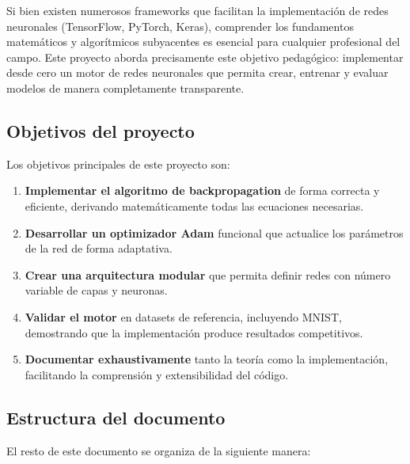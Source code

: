\documentclass[a4paper,11pt]{article}
\begin{document}
Si bien existen numerosos frameworks que facilitan la implementación de redes neuronales (TensorFlow, PyTorch, Keras), comprender los fundamentos matemáticos y algorítmicos subyacentes es esencial para cualquier profesional del campo. Este proyecto aborda precisamente este objetivo pedagógico: implementar desde cero un motor de redes neuronales que permita crear, entrenar y evaluar modelos de manera completamente transparente.

\subsection{Objetivos del proyecto}

Los objetivos principales de este proyecto son:

\begin{enumerate}
    \item \textbf{Implementar el algoritmo de backpropagation} de forma correcta y eficiente, derivando matemáticamente todas las ecuaciones necesarias.
    
    \item \textbf{Desarrollar un optimizador Adam} funcional que actualice los parámetros de la red de forma adaptativa.
    
    \item \textbf{Crear una arquitectura modular} que permita definir redes con número variable de capas y neuronas.
    
    \item \textbf{Validar el motor} en datasets de referencia, incluyendo MNIST, demostrando que la implementación produce resultados competitivos.
    
    \item \textbf{Documentar exhaustivamente} tanto la teoría como la implementación, facilitando la comprensión y extensibilidad del código.
\end{enumerate}

\subsection{Estructura del documento}

El resto de este documento se organiza de la siguiente manera:
\end{document}
